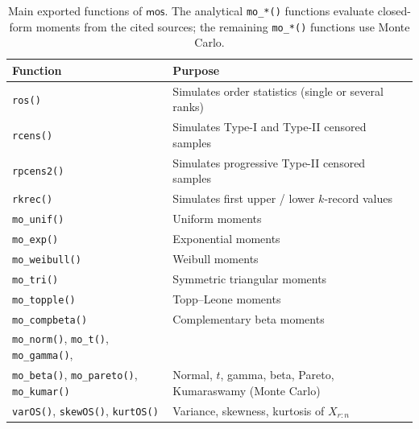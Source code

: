 \documentclass[twoside]{article}
\begin{document}
\begin{table}[h]
\begin{center}
\small
\caption{\label{tab:functions}Main exported functions of $\mathsf{mos}$. The
analytical \texttt{mo\_*()} functions evaluate closed-form moments from the cited
sources; the remaining \texttt{mo\_*()} functions use Monte Carlo.}
\begin{tabular}{|l|l|}
  \hline
Function & Purpose \\  \hline \hline
\texttt{ros()} & Simulates order statistics (single or several ranks) \\
\texttt{rcens()} & Simulates Type-I and Type-II censored samples \\
\texttt{rpcens2()} & Simulates progressive Type-II censored samples \\
\texttt{rkrec()} & Simulates first upper / lower $k$-record values \\
\hline
\texttt{mo\_unif()} & Uniform moments \citep{ArnoldBalakrishnan2012} \\
\texttt{mo\_exp()} & Exponential moments \citep{Ahsanullah2013} \\
\texttt{mo\_weibull()} & Weibull moments \citep{HarterBalakrishnan1996} \\
\texttt{mo\_tri()} & Symmetric triangular moments \citep{Nagaraja2013} \\
\texttt{mo\_topple()} & Topp--Leone moments \citep{Genc2012} \\
\texttt{mo\_compbeta()} & Complementary beta moments \citep{Jones2002,Makouei2021} \\
\texttt{mo\_norm()}, \texttt{mo\_t()}, \texttt{mo\_gamma()}, & \\
\texttt{mo\_beta()}, \texttt{mo\_pareto()}, \texttt{mo\_kumar()} & Normal, $t$, gamma, beta, Pareto, Kumaraswamy (Monte Carlo) \\
\hline
\texttt{varOS()}, \texttt{skewOS()}, \texttt{kurtOS()} & Variance, skewness, kurtosis of $X_{r:n}$ \\  \hline
\end{tabular}
\end{center}
\end{table}
\end{document}

